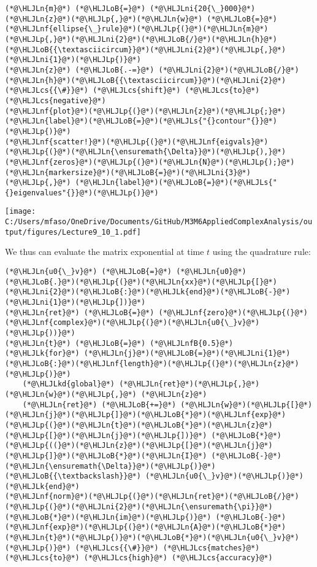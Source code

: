 \documentclass[12pt,landscape]{article}
\newcommand{\HLJLk}[1]{\textcolor[RGB]{148,91,176}{\textbf{#1}}}
\newcommand{\HLJLkd}[1]{\textcolor[RGB]{214,102,97}{\textit{#1}}}
\newcommand{\HLJLn}[1]{#1}
\newcommand{\HLJLnf}[1]{\textcolor[RGB]{66,102,213}{#1}}
\newcommand{\HLJLs}[1]{\textcolor[RGB]{201,61,57}{#1}}
\newcommand{\HLJLnfB}[1]{\textcolor[RGB]{59,151,46}{#1}}
\newcommand{\HLJLni}[1]{\textcolor[RGB]{59,151,46}{#1}}
\newcommand{\HLJLoB}[1]{\textcolor[RGB]{102,102,102}{\textbf{#1}}}
\newcommand{\HLJLp}[1]{#1}
\newcommand{\HLJLcs}[1]{\textcolor[RGB]{153,153,119}{\textit{#1}}}
\def\cent#1{\begin{center}#1\end{center} }
\begin{document}
{\begin{lstlisting}
(*@\HLJLn{m}@*) (*@\HLJLoB{=}@*) (*@\HLJLni{20{\_}000}@*)
(*@\HLJLn{z}@*)(*@\HLJLp{,}@*)(*@\HLJLn{w}@*) (*@\HLJLoB{=}@*) (*@\HLJLnf{ellipse{\_}rule}@*)(*@\HLJLp{(}@*)(*@\HLJLn{m}@*)(*@\HLJLp{,}@*)(*@\HLJLni{2}@*)(*@\HLJLoB{/}@*)(*@\HLJLn{h}@*)(*@\HLJLoB{{\textasciicircum}}@*)(*@\HLJLni{2}@*)(*@\HLJLp{,}@*)(*@\HLJLni{1}@*)(*@\HLJLp{)}@*)
(*@\HLJLn{z}@*) (*@\HLJLoB{.-=}@*) (*@\HLJLni{2}@*)(*@\HLJLoB{/}@*)(*@\HLJLn{h}@*)(*@\HLJLoB{{\textasciicircum}}@*)(*@\HLJLni{2}@*) (*@\HLJLcs{{\#}}@*) (*@\HLJLcs{shift}@*) (*@\HLJLcs{to}@*) (*@\HLJLcs{negative}@*)
(*@\HLJLnf{plot}@*)(*@\HLJLp{(}@*)(*@\HLJLn{z}@*)(*@\HLJLp{;}@*) (*@\HLJLn{label}@*)(*@\HLJLoB{=}@*)(*@\HLJLs{"{}contour"{}}@*)(*@\HLJLp{)}@*)
(*@\HLJLnf{scatter!}@*)(*@\HLJLp{(}@*)(*@\HLJLnf{eigvals}@*)(*@\HLJLp{(}@*)(*@\HLJLn{\ensuremath{\Delta}}@*)(*@\HLJLp{),}@*) (*@\HLJLnf{zeros}@*)(*@\HLJLp{(}@*)(*@\HLJLn{N}@*)(*@\HLJLp{);}@*) (*@\HLJLn{markersize}@*)(*@\HLJLoB{=}@*)(*@\HLJLni{3}@*)(*@\HLJLp{,}@*) (*@\HLJLn{label}@*)(*@\HLJLoB{=}@*)(*@\HLJLs{"{}eigenvalues"{}}@*)(*@\HLJLp{)}@*)
\end{lstlisting}

\cent{\texttt{[image: C:/Users/mfaso/OneDrive/Documents/GitHub/M3M6AppliedComplexAnalysis/output/figures/Lecture9\_10\_1.pdf]}}

We thus can evaluate the matrix exponential at time $t$ using the quadrature rule:


\begin{lstlisting}
(*@\HLJLn{u0{\_}v}@*) (*@\HLJLoB{=}@*) (*@\HLJLn{u0}@*)(*@\HLJLoB{.}@*)(*@\HLJLp{(}@*)(*@\HLJLn{xx}@*)(*@\HLJLp{[}@*)(*@\HLJLni{2}@*)(*@\HLJLoB{:}@*)(*@\HLJLk{end}@*)(*@\HLJLoB{-}@*)(*@\HLJLni{1}@*)(*@\HLJLp{])}@*)
(*@\HLJLn{ret}@*) (*@\HLJLoB{=}@*) (*@\HLJLnf{zero}@*)(*@\HLJLp{(}@*)(*@\HLJLnf{complex}@*)(*@\HLJLp{(}@*)(*@\HLJLn{u0{\_}v}@*)(*@\HLJLp{))}@*)
(*@\HLJLn{t}@*) (*@\HLJLoB{=}@*) (*@\HLJLnfB{0.5}@*)
(*@\HLJLk{for}@*) (*@\HLJLn{j}@*)(*@\HLJLoB{=}@*)(*@\HLJLni{1}@*)(*@\HLJLoB{:}@*)(*@\HLJLnf{length}@*)(*@\HLJLp{(}@*)(*@\HLJLn{z}@*)(*@\HLJLp{)}@*)
    (*@\HLJLkd{global}@*) (*@\HLJLn{ret}@*)(*@\HLJLp{,}@*) (*@\HLJLn{w}@*)(*@\HLJLp{,}@*) (*@\HLJLn{z}@*)
    (*@\HLJLn{ret}@*) (*@\HLJLoB{+=}@*) (*@\HLJLn{w}@*)(*@\HLJLp{[}@*)(*@\HLJLn{j}@*)(*@\HLJLp{]}@*)(*@\HLJLoB{*}@*)(*@\HLJLnf{exp}@*)(*@\HLJLp{(}@*)(*@\HLJLn{t}@*)(*@\HLJLoB{*}@*)(*@\HLJLn{z}@*)(*@\HLJLp{[}@*)(*@\HLJLn{j}@*)(*@\HLJLp{])}@*) (*@\HLJLoB{*}@*) (*@\HLJLp{((}@*)(*@\HLJLn{z}@*)(*@\HLJLp{[}@*)(*@\HLJLn{j}@*)(*@\HLJLp{]}@*)(*@\HLJLoB{*}@*)(*@\HLJLn{I}@*) (*@\HLJLoB{-}@*) (*@\HLJLn{\ensuremath{\Delta}}@*)(*@\HLJLp{)}@*) (*@\HLJLoB{{\textbackslash}}@*) (*@\HLJLn{u0{\_}v}@*)(*@\HLJLp{)}@*)
(*@\HLJLk{end}@*)
(*@\HLJLnf{norm}@*)(*@\HLJLp{(}@*)(*@\HLJLn{ret}@*)(*@\HLJLoB{/}@*)(*@\HLJLp{(}@*)(*@\HLJLni{2}@*)(*@\HLJLn{\ensuremath{\pi}}@*)(*@\HLJLoB{*}@*)(*@\HLJLn{im}@*)(*@\HLJLp{)}@*) (*@\HLJLoB{-}@*) (*@\HLJLnf{exp}@*)(*@\HLJLp{(}@*)(*@\HLJLn{A}@*)(*@\HLJLoB{*}@*)(*@\HLJLn{t}@*)(*@\HLJLp{)}@*)(*@\HLJLoB{*}@*)(*@\HLJLn{u0{\_}v}@*)(*@\HLJLp{)}@*) (*@\HLJLcs{{\#}}@*) (*@\HLJLcs{matches}@*) (*@\HLJLcs{to}@*) (*@\HLJLcs{high}@*) (*@\HLJLcs{accuracy}@*)
\end{lstlisting}

}
\end{document}
